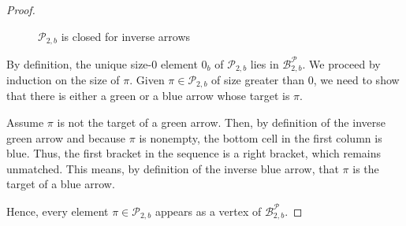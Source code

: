 \documentclass[11pt]{article}
\theoremstyle{definition}
\theoremstyle{remark}
\theoremstyle{definition}
\numberwithin{equation}{section}
\begin{document}
\begin{proof}
\begin{itemize}
\begin{figure}[h]
    \centering
    \quad
    \caption{$\mathcal{P}_{2,b}$ is closed for inverse arrows}
    \label{fig:closed_for_inverse_arrow}
\end{figure}
\end{itemize}

By definition, the unique size-\(0\) element \(0_b\) of \(\mathcal{P}_{2,b}\) lies in \(\mathcal{B}_{2,b}^{\mathcal{P}}\). We proceed by induction on the size of \(\pi\). Given \(\pi \in \mathcal{P}_{2,b}\) of size greater than \(0\), we need to show that there is either a green or a blue arrow whose target is \(\pi\).

Assume \(\pi\) is not the target of a green arrow. Then, by definition of the inverse green arrow and because \(\pi\) is nonempty, the bottom cell in the first column is blue. Thus, the first bracket in the sequence is a right bracket, which remains unmatched. This means, by definition of the inverse blue arrow, that \(\pi\) is the target of a blue arrow.

Hence, every element \(\pi \in \mathcal{P}_{2,b}\) appears as a vertex of \(\mathcal{B}_{2,b}^{\mathcal{P}}\).
\end{proof}
\end{document}
